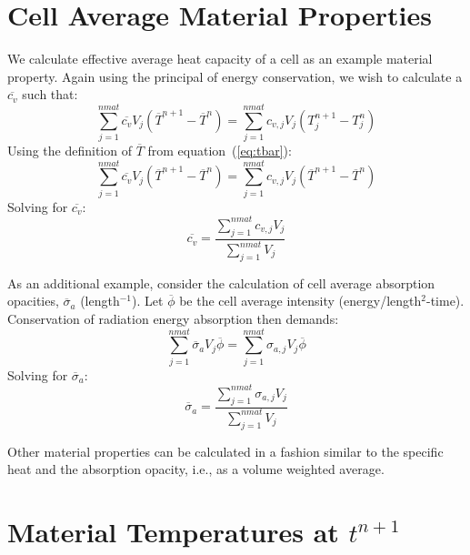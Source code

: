 \documentclass[12pt]{article}
\begin{document}
\section{Cell Average Material Properties}

We calculate effective average heat capacity of a cell as an example
material property. Again using the principal of energy conservation, 
we wish to calculate a $\overline{c_{v}}$ such that:
\begin{equation}
\sum_{j=1}^{nmat} \overline{c_{v}}  V_{j} 
(\overline{T}^{n+1}-\overline{T}^{n})   = 
\sum_{j=1}^{nmat} c_{v,j} V_{j} (T_{j}^{n+1}-T_{j}^{n})
\end{equation}
Using the definition of $\overline{T}$ from equation~(\ref{eq:tbar}):
\begin{equation}
\sum_{j=1}^{nmat}  \overline{c_{v}} V_{j}  
(\overline{T}^{n+1}-\overline{T}^{n})   = 
 \sum_{j=1}^{nmat} c_{v,j} V_{j} (\overline{T}^{n+1}-\overline{T}^{n})
\end{equation}
Solving for $\overline{c_{v}}$:
\begin{equation}
\overline{c_{v}} = \frac{ \sum_{j=1}^{nmat} c_{v,j} V_{j} } 
{\sum_{j=1}^{nmat} V_{j}}
\label{eq:cvbar}
\end{equation}


As an additional example, consider the calculation of cell average absorption
opacities, $\overline{\sigma}_a$ (length$^{-1}$).
 Let $\overline{\phi}$ be the cell 
average intensity (energy/length$^2$-time). Conservation of radiation
energy absorption then demands:
\begin{equation}
 \sum_{j=1}^{nmat} \overline{\sigma}_a V_j \overline{\phi} =
\sum_{j=1}^{nmat} \sigma_{a,j} V_j \overline{\phi}
\end{equation}
Solving for $\overline{\sigma}_a$:
\begin{equation}
\overline{\sigma}_{a} = \frac{ \sum_{j=1}^{nmat} \sigma_{a,j} V_{j} } 
{\sum_{j=1}^{nmat} V_{j}}
\end{equation}

Other material properties can be calculated in a fashion similar
to the specific heat and the absorption opacity, i.e.,
as a volume weighted average.

\section{Material Temperatures at $t^{n+1}$}
\end{document}
